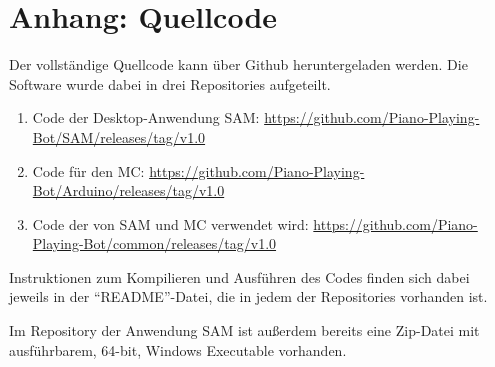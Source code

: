 \chapter{Anhang: Quellcode} \label{appndix-code}

Der vollständige Quellcode kann über Github heruntergeladen werden.
Die Software wurde dabei in drei Repositories aufgeteilt.

\begin{enumerate}
	\item Code der Desktop-Anwendung \ac{SAM}: \url{https://github.com/Piano-Playing-Bot/SAM/releases/tag/v1.0}
	\item Code für den \ac{MC}: \url{https://github.com/Piano-Playing-Bot/Arduino/releases/tag/v1.0}
	\item Code der von \ac{SAM} und \ac{MC} verwendet wird: \url{https://github.com/Piano-Playing-Bot/common/releases/tag/v1.0}
\end{enumerate}

Instruktionen zum Kompilieren und Ausführen des Codes finden sich dabei jeweils in der \enquote{README}-Datei, die in jedem der Repositories vorhanden ist.

Im Repository der Anwendung \ac{SAM} ist außerdem bereits eine Zip-Datei mit ausführbarem, 64-bit, Windows Executable vorhanden.